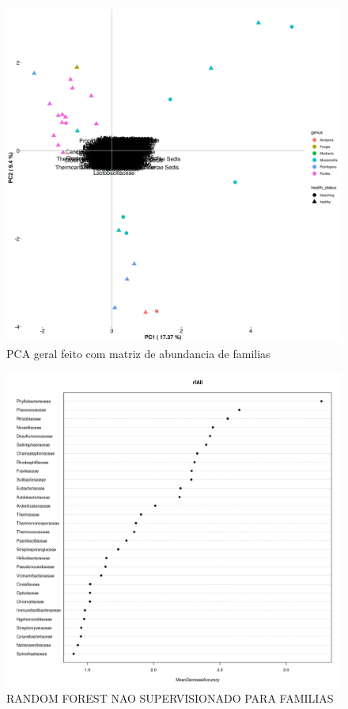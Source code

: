 \documentclass[12pt, a4paper]{report}
\begin{document}
\begin{figure}[H]
\centering
\includegraphics[scale=0.4]{figures/familia/output_PCA_corais_familia_mg_rast_2018_10_30.jpg}
\caption{PCA geral feito com matriz de abundancia de familias}
\label{fig:PCAfeito30deoutubroparafamilia}
\end{figure}

\begin{figure}[H]
\centering
\includegraphics[scale=0.4]{figures/familia/randomforest_nao_supervi_corais_mgrast_familia_leticia_2018_10_30.jpeg}
\caption{RANDOM FOREST NAO SUPERVISIONADO PARA FAMILIAS}
\label{fig:Randomforestnaosupervisionadoparafamilafeito30deoutubroparafamilia}
\end{figure}
\end{document}
